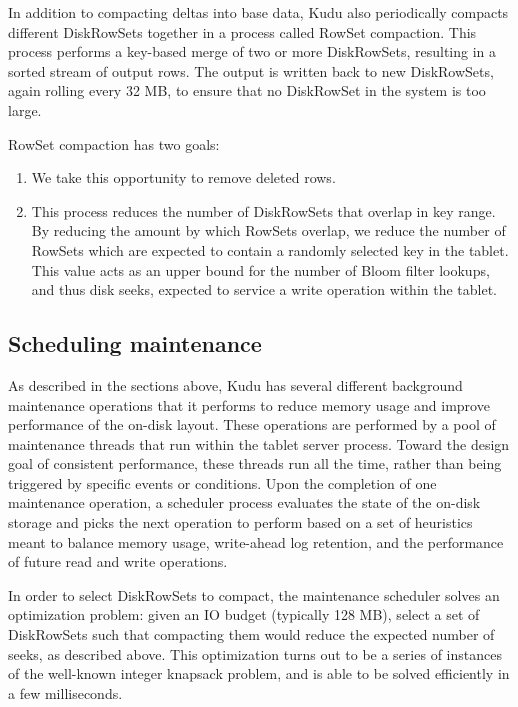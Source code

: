 \documentclass[twocolumn,9pt]{article}
\begin{document}
In addition to compacting deltas into base data, Kudu also periodically compacts different
DiskRowSets together in a process called RowSet compaction. This process performs a
key-based merge of two or more DiskRowSets, resulting in a sorted stream of output rows.
The output is written back to new DiskRowSets, again rolling every 32 MB, to ensure that no
DiskRowSet in the system is too large.

RowSet compaction has two goals:
\begin{enumerate}
\item We take this opportunity to remove deleted rows.
\item This process reduces the number of DiskRowSets that overlap in key range.
By reducing the amount by which RowSets overlap, we reduce the number of RowSets
which are expected to contain a randomly selected key in the tablet. This value acts
as an upper bound for the number of Bloom filter lookups, and thus disk seeks, expected
to service a write operation within the tablet.
\end{enumerate}

\subsection{Scheduling maintenance}
\label{sec:maintenance}

As described in the sections above, Kudu has several different background maintenance operations
that it performs to reduce memory usage and improve performance of the on-disk layout. These
operations are performed by a pool of maintenance threads that run within the tablet server
process. Toward the design goal of consistent performance, these
threads run all the time, rather than being triggered by specific events or conditions.
Upon the completion of one maintenance operation, a scheduler process evaluates the
state of the on-disk storage and picks the next operation to perform based on a set
of heuristics meant to balance memory usage, write-ahead log retention, and the
performance of future read and write operations.

In order to select DiskRowSets to compact, the maintenance scheduler solves an optimization
problem: given an IO budget (typically 128 MB), select a set of DiskRowSets
such that compacting them would reduce the expected number of seeks, as described above.
This optimization turns out to be a series of instances of the well-known integer knapsack
problem, and is able to be solved efficiently in a few milliseconds.
\end{document}

